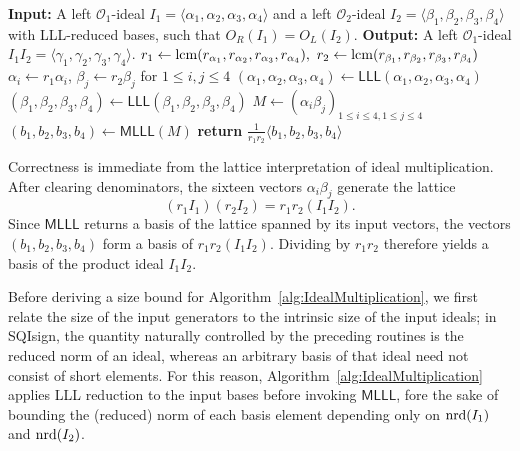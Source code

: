 \begin{algorithm}
\caption{CompactIdealMultiplication($I_1,I_2$)}
\label{alg:IdealMultiplication}
\begin{algorithmic}[1]
  \Statex \textbf{Input:} A left $\mathcal{O}_1$-ideal $I_1 = \langle \alpha_1,\alpha_2,\alpha_3,\alpha_4 \rangle$ and a left $\mathcal{O}_2$-ideal $I_2 = \langle \beta_1,\beta_2,\beta_3,\beta_4 \rangle$ with LLL-reduced bases, such that $O_R(I_1)=O_L(I_2)$.
  \Statex \textbf{Output:} A left $\mathcal{O}_1$-ideal $I_1I_2 = \langle \gamma_1,\gamma_2,\gamma_3,\gamma_4 \rangle$.
  \State $r_1 \gets \mathrm{lcm}(r_{\alpha_1},r_{\alpha_2},r_{\alpha_3},r_{\alpha_4}),\
         r_2 \gets \mathrm{lcm}(r_{\beta_1},r_{\beta_2},r_{\beta_3},r_{\beta_4})$
  \State $\alpha_i \gets r_1\alpha_i$, $\beta_j \gets r_2\beta_j$ for $1\leq i,j \leq4$
  \State $(\alpha_1,\alpha_2,\alpha_3,\alpha_4) \gets \textsf{LLL}(\alpha_1,\alpha_2,\alpha_3,\alpha_4)$
  \State $(\beta_1,\beta_2,\beta_3,\beta_4) \gets \textsf{LLL}(\beta_1,\beta_2,\beta_3,\beta_4)$
  \State $M \gets (\alpha_i\beta_j)_{1\le i\le4, 1\le j\le4}$
  \State $(b_1,b_2,b_3,b_4) \gets \mathsf{MLLL}(M)$
  \State \textbf{return} $\frac{1}{r_1r_2}\langle b_1,b_2,b_3,b_4 \rangle$
\end{algorithmic}
\end{algorithm}

Correctness is immediate from the lattice interpretation of ideal multiplication. After clearing denominators, the sixteen vectors $\alpha_i\beta_j$ generate the lattice
\[
(r_1I_1)(r_2I_2)=r_1r_2(I_1I_2).
\]
Since $\mathsf{MLLL}$ returns a basis of the lattice spanned by its input vectors, the vectors $(b_1,b_2,b_3,b_4)$ form a basis of $r_1r_2(I_1I_2)$. Dividing by $r_1r_2$ therefore yields a basis of the product ideal $I_1I_2$.

Before deriving a size bound for Algorithm~\ref{alg:IdealMultiplication}, we first relate the size of the input generators to the intrinsic size of the input ideals;
in SQIsign, the quantity naturally controlled by the preceding routines is the reduced norm of an ideal, whereas an arbitrary basis of that ideal need not consist of short elements. 
For this reason, Algorithm~\ref{alg:IdealMultiplication} applies LLL reduction to the input bases before invoking $\mathsf{MLLL}$, fore the sake of bounding the (reduced) norm of each basis element depending only on $\mathrm{nrd}(I_1)$ and $\mathrm{nrd}(I_2)$.

